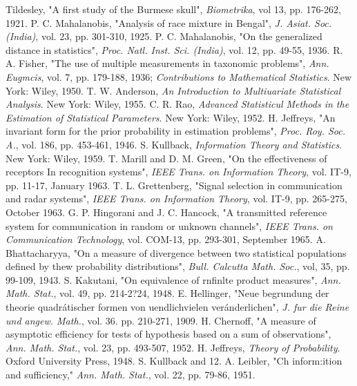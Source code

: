 \documentclass{sbrt2017port}
\begin{document}
\begin{thebibliography}{99}

 Tildesley, "A first study of the Burmese skull", \textit{Biometrika}, vol 13, pp. 176-262, 1921.
 P. C. Mahalanobis, "Analysis of race mixture in Bengal", \textit{J. Asiat. Soc. (India)}, vol. 23, pp. 301-310, 1925.
 P. C. Mahalanobis, "On the generalized distance in statistics", \textit{Proc. Natl. Inst. Sci. (India)}, vol. 12, pp. 49-55, 1936.
 R. A. Fisher, "The use of multiple measurements in taxonomic problems", \textit{Ann. Eugmcis}, vol. 7, pp. 179-188, 1936; \textit{Contributions to Mathematical Statistics}. New York: Wiley, 1950.
 T. W. Anderson, \textit{An Introduction to Multiuariate Statistical Analysis}. New York: Wiley, 1955.
 C. R. Rao, \textit{Advanced Statisticul Methods in the Estimation of Statistical Parameters}. New York: Wiley, 1952.
 H. Jeffreys, "An invariant form for the prior probability in estimation problems", \textit{Proc. Roy. Soc. A.}, vol. 186, pp. 453-461, 1946.
 S. Kullback, \textit{Information Theory and Statistics}. New York: Wiley, 1959.
 T. Marill and D. M. Green, "On the effectiveness of receptors In recognition systems", \textit{IEEE Trans. on Information Theory}, vol. IT-9, pp. 11-17, January 1963.
 T. L. Grettenberg, "Signal selection in communication and radar systems", \textit{IEEE Trans. on Information Theory}, vol. IT-9, pp. 265-275, October 1963.
 G. P. Hingorani and J. C. Hancock, "A transmitted reference system for communication in random or unknown channels", \textit{IEEE Trans. on Communication Technology}, vol. COM-13, pp. 293-301, September 1965.
 A. Bhattacharyya, "On a measure of divergence between two statistical populations defined by thew probability distributions", \textit{Bull. Calcutta Math. Soc.}, vol, 35, pp. 99-109, 1943.
 S. Kakutani, "On equivalence of rnfinlte product measures", \textit{Ann. Math. Stat.}, vol. 49, pp. 214-2?24, 1948.
 E. Hellinger, "Neue begrundung der theorie quadrátischer formen von uendlichvielen veránderlichen", \textit{J. fur die Reine und angew. Math.}, vol. 36. pp. 210-271, 1909.
 H. Chernoff, "A measure of asymptotic efficiency for tests of hypothesis based on a sum of observations", \textit{Ann. Math. Stat.}, vol. 23, pp. 493-507, 1952.
 H. Jeffreys, \textit{Theory of Probability}. Oxford University Press, 1948.
 S. Kullback and 12. A. Leibler, "Ch inform:ition and sufficiency," \textit{Ann. Math. Stat.}, vol. 22, pp. 79-86, 1951.

\end{thebibliography}
\end{document}
